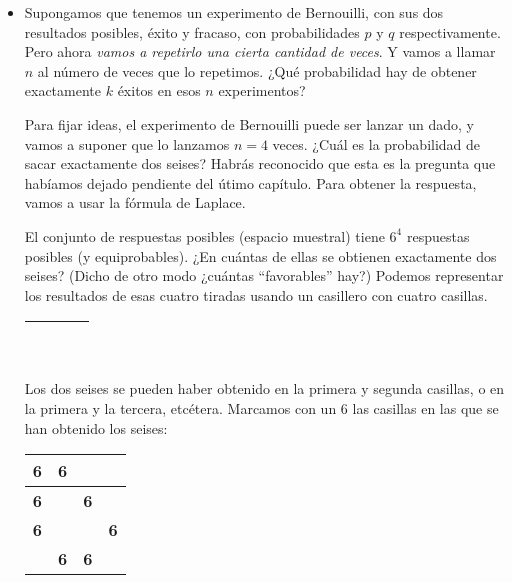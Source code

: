\begin{itemize}

        \item Supongamos que tenemos un experimento de Bernouilli, con sus dos resultados posibles, éxito y fracaso, con probabilidades $p$ y $q$ respectivamente. Pero ahora {\em vamos a repetirlo una cierta cantidad de veces}. Y vamos a llamar $n$ al número de veces que lo repetimos. ¿Qué probabilidad hay de obtener exactamente $k$ éxitos en esos $n$ experimentos?

            Para fijar ideas, el experimento de Bernouilli puede ser lanzar un dado, y vamos a suponer que lo lanzamos $n=4$ veces. ¿Cuál es la probabilidad de sacar exactamente dos seises? Habrás reconocido que esta es la pregunta que habíamos dejado pendiente del útimo capítulo. Para obtener la respuesta, vamos a usar la fórmula de Laplace.
            \begin{Ejemplo}\label{ejem:BinomialDosSeisesCuatroTiradas}
            El conjunto de respuestas posibles (espacio muestral) tiene $6^4$ respuestas posibles (y equiprobables). ¿En cuántas de ellas se obtienen exactamente dos seises? (Dicho de otro modo ¿cuántas ``favorables'' hay?) Podemos representar los resultados de esas cuatro tiradas usando un casillero con cuatro casillas.
            \begin{center}
            \begin{tabular}{|c|c|c|c|}
            \hline
             \rule{0cm}{0.5cm}\rule{0.3cm}{0cm}&\rule{0.3cm}{0cm}&\rule{0.3cm}{0cm} &\rule{0.3cm}{0cm}\\
             \hline
             \end{tabular}
             \end{center}
             Los dos seises se pueden haber obtenido en la primera y segunda casillas, o en la primera y la tercera, etcétera. Marcamos con un $6$ las casillas en las que se han obtenido los seises:
            \begin{center}
            \begin{tabular}{|c|c|c|c|}
            \hline
             \rule{0cm}{0.5cm}\mbox{\large\bf 6}&\mbox{\large\bf 6}& &\\
            \hline
             \rule{0cm}{0.5cm}\mbox{\large\bf 6}&& \mbox{\large\bf 6}&\\
            \hline
             \rule{0cm}{0.5cm}\mbox{\large\bf 6}&& &\mbox{\large\bf 6}\\
            \hline
             \rule{0cm}{0.5cm}&\mbox{\large\bf 6}& \mbox{\large\bf 6}&\\

\end{tabular}
\end{center}
\end{Ejemplo}
\end{itemize}
